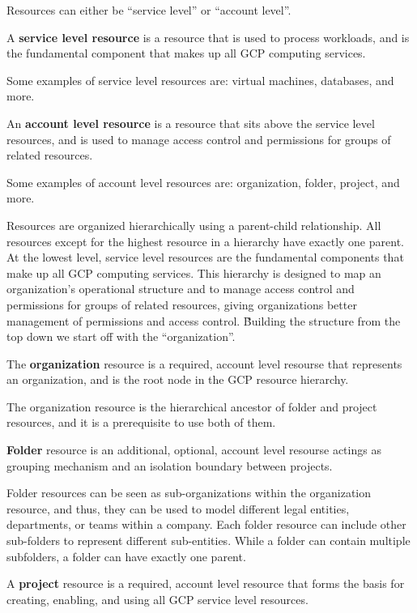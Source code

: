 Resources can either be ``service level'' or ``account level''.

A \textbf{service level resource} is a resource that is used to process workloads, and is the fundamental component
that makes up all GCP computing services.
\ed

\be
Some examples of service level resources are: virtual machines, databases, and more.
\ee

An \textbf{account level resource} is a resource that sits above the service level resources, and is used to manage
access control and permissions for groups of related resources.
\ed

\be
Some examples of account level resources are: organization, folder, project, and more.
\ee

Resources are organized hierarchically using a parent-child relationship. All resources except for the highest resource
in a hierarchy have exactly one parent. At the lowest level, service level resources are the fundamental components that
make up all GCP computing services. This hierarchy is designed to map an organization's operational structure and to
manage access control and permissions for groups of related resources, giving organizations better management of
permissions and access control. \v

Building the structure from the top down we start off with the ``organization''.

\bd[Organization]
The \textbf{organization} resource is a required, account level resourse that represents an organization, and is the
root node in the GCP resource hierarchy.
\ed

The organization resource is the hierarchical ancestor of folder and project resources, and it is a prerequisite to
use both of them.

\bd[Folder]
\textbf{Folder} resource is an additional, optional, account level resourse actings as grouping mechanism and an
isolation boundary between projects.
\ed

Folder resources can be seen as sub-organizations within the organization resource, and thus, they can be used to model
different legal entities, departments, or teams within a company. Each folder resource can include other sub-folders to
represent different sub-entities. While a folder can contain multiple subfolders, a folder can have exactly one parent.

\bd[Project]
A \textbf{project} resource is a required, account level resource that forms the basis for creating, enabling, and
using all GCP service level resources.
\ed

